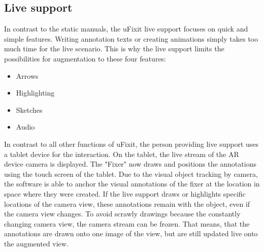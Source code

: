 \subsection{Live support}
In contrast to the static manuals, the uFixit live support focuses on quick and simple features. Writing annotation texts or creating animations simply takes too much time for the live scenario. This is why the live support limits the possibilities for augmentation to these four features:
\begin{itemize}
\item Arrows
\item Highlighting
\item Sketches
\item Audio
\end{itemize}

In contrast to all other functions of uFixit, the person providing live support uses a tablet device for the interaction. On the tablet, the live stream of the AR device camera is displayed. The "Fixer" now draws and positions the annotations using the touch screen of the tablet.
Due to the visual object tracking by camera, the software is able to anchor the visual annotations of the fixer at the location in space where they were created. If the live support draws or highlights specific locations of the camera view, these annotations remain with the object, even if the camera view changes. To avoid scrawly drawings because the constantly changing camera view, the camera stream can be frozen. That means, that the annotations are drawn onto one image of the view, but are still updated live onto the augmented view.
